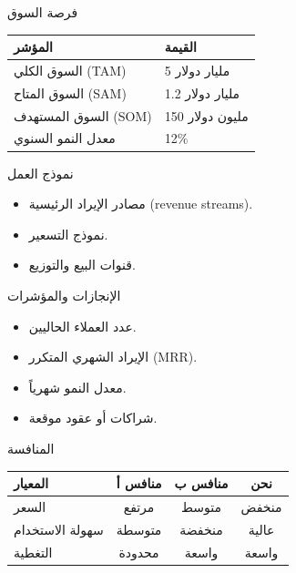 \documentclass[aspectratio=169,11pt]{beamer}
\let\textEN\textenglish
\begin{document}
\begin{frame}{فرصة السوق}
\begin{table}[h]
\centering
\begin{tabularx}{0.85\textwidth}{lX}
\toprule
المؤشر & القيمة \\
\midrule
السوق الكلي \textEN{(TAM)} & 5 مليار دولار \\
السوق المتاح \textEN{(SAM)} & 1.2 مليار دولار \\
السوق المستهدف \textEN{(SOM)} & 150 مليون دولار \\
معدل النمو السنوي & 12\% \\
\bottomrule
\end{tabularx}
\end{table}
\end{frame}

\begin{frame}{نموذج العمل}
\begin{itemize}
  \item مصادر الإيراد الرئيسية \textEN{(revenue streams)}.
  \item نموذج التسعير.
  \item قنوات البيع والتوزيع.
\end{itemize}
\end{frame}

\begin{frame}{الإنجازات والمؤشرات}
\begin{itemize}
  \item عدد العملاء الحاليين.
  \item الإيراد الشهري المتكرر \textEN{(MRR)}.
  \item معدل النمو شهرياً.
  \item شراكات أو عقود موقعة.
\end{itemize}
\end{frame}

\begin{frame}{المنافسة}
\begin{table}[h]
\centering
\begin{tabularx}{0.9\textwidth}{lccc}
\toprule
المعيار & منافس أ & منافس ب & نحن \\
\midrule
السعر & مرتفع & متوسط & منخفض \\
سهولة الاستخدام & متوسطة & منخفضة & عالية \\
التغطية & محدودة & واسعة & واسعة \\
\bottomrule
\end{tabularx}
\end{table}
\end{frame}
\end{document}
